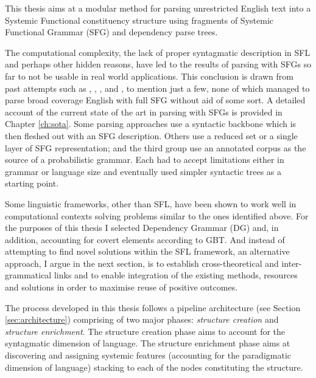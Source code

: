     This thesis aims at a modular method for parsing unrestricted English text into a Systemic Functional constituency structure using fragments of Systemic Functional Grammar (SFG) and dependency parse trees.
    
    The computational complexity, the lack of proper syntagmatic description in SFL and perhaps other hidden reasons, have led to the results of parsing with SFGs so far to not be usable in real world applications. This conclusion is drawn from past attempts such as \citet{Kasper1988}, \citet{Kay1985}, \citet{ODonoghue1991a}, \citet{ODonnell1993} and \citet{Day2007}, to mention just a few, none of which managed to parse broad coverage English with full SFG without aid of some sort. A detailed account of the current state of the art in parsing with SFGs is provided in Chapter \ref{ch:sota}. Some parsing approaches use a syntactic backbone which is then fleshed out with an SFG description. Others use a reduced set or a single layer of SFG representation; and the third group use an annotated corpus as the source of a probabilistic grammar. Each had to accept limitations either in grammar or language size and eventually used simpler syntactic trees as a starting point.%

    
    Some linguistic frameworks, other than SFL, have been shown to work well in computational contexts solving problems similar to the ones identified above. For the purposes of this thesis I selected Dependency Grammar (DG) and, in addition, accounting for covert elements according to GBT. And instead of attempting to find novel solutions within the SFL framework, an alternative approach, I argue in the next section, is to establish cross-theoretical and inter-grammatical links and to enable integration of the existing methods, resources and solutions in order to maximise reuse of positive outcomes.

    The process developed in this thesis follows a pipeline architecture (see Section \ref{sec:architecture}) comprising of two major phases: \textit{structure creation} and \textit{structure enrichment}. The structure creation phase aims to account for the syntagmatic dimension of language. %
    The structure enrichment phase aims at discovering and assigning systemic features (accounting for the paradigmatic dimension of language) stacking to each of the nodes constituting the structure. 


